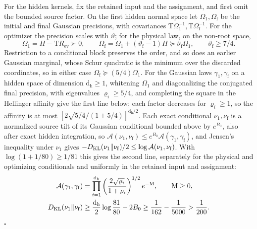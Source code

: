 For the hidden kernels, fix the retained input and the assignment, and first
omit the bounded source factor. On the first hidden normal space let
\(\Omega_1,\Omega_{\mathrm f}\) be the initial and final Gaussian precisions, with
covariances \(\mathrm T\Omega_1^{-1},\mathrm T\Omega_{\mathrm f}^{-1}\). For the
optimizer the precision scales with \(\vartheta\); for the physical law, on the
non-root space,
\begin{equation}
 \Omega_1=H-\mathrm TR_{\mathrm{ev}}\succ0,
 \qquad
 \Omega_{\mathrm f}=\Omega_1+(\vartheta_{\mathrm f}-1)H
       \succeq\vartheta_{\mathrm f}\Omega_1,
 \qquad \vartheta_{\mathrm f}\ge7/4.
 \label{eq:rg-formation-physical-precision-growth}
\end{equation}
Restriction to a conditional block preserves the order, and so does an earlier
Gaussian marginal, whose Schur quadratic is the minimum over the discarded
coordinates, so in either case \(\Omega_{\mathrm f}\succeq(5/4)\Omega_1\). For
the Gaussian laws
\(\gamma_1,\gamma_{\mathrm f}\) on a hidden space of dimension
\(\mathrm d_{\mathrm h}\ge1\), whitening \(\Omega_1\) and diagonalizing the
conjugated final precision, with eigenvalues \(\varrho_i\ge5/4\), and completing
the square in the Hellinger affinity give the first line below; each factor
decreases for \(\varrho_i\ge1\), so the affinity is at most
\([2\sqrt{5/4}/(1+5/4)]^{\mathrm d_{\mathrm h}/2}\). Each exact conditional
\(\nu_1,\nu_{\mathrm f}\) is a normalized source tilt of its Gaussian
conditional bounded above by \(e^{B_0}\), also after exact hidden integration,
so \(\mathcal A(\nu_1,\nu_{\mathrm f})\le e^{B_0}\mathcal A(\gamma_1,\gamma_{\mathrm f})\),
and Jensen's inequality under \(\nu_1\) gives
\(-D_{\mathrm{KL}}(\nu_1\Vert\nu_{\mathrm f})/2\le\log\mathcal A(\nu_1,\nu_{\mathrm f})\).
With \(\log(1+1/80)\ge1/81\) this gives the second line, separately for the
physical and optimizing conditionals and uniformly in the retained input and
assignment:
\begin{align}
 \mathcal A(\gamma_1,\gamma_{\mathrm f})
 &=\prod_{i=1}^{\mathrm d_{\mathrm h}}
       \left(\frac{2\sqrt{\varrho_i}}{1+\varrho_i}\right)^{1/2}
       e^{-\mathrm M},
 \qquad \mathrm M\ge0,
 \label{eq:rg-formation-gaussian-affinity}\\
 D_{\mathrm{KL}}(\nu_1\Vert\nu_{\mathrm f})
 &\ge\frac{\mathrm d_{\mathrm h}}{2}\log\frac{81}{80}-2B_0
 \ge\frac1{162}-\frac1{5000}>\frac1{200}.
 \label{eq:rg-formation-hidden-kernel-change}
\end{align}
\hfill\(\square\)

